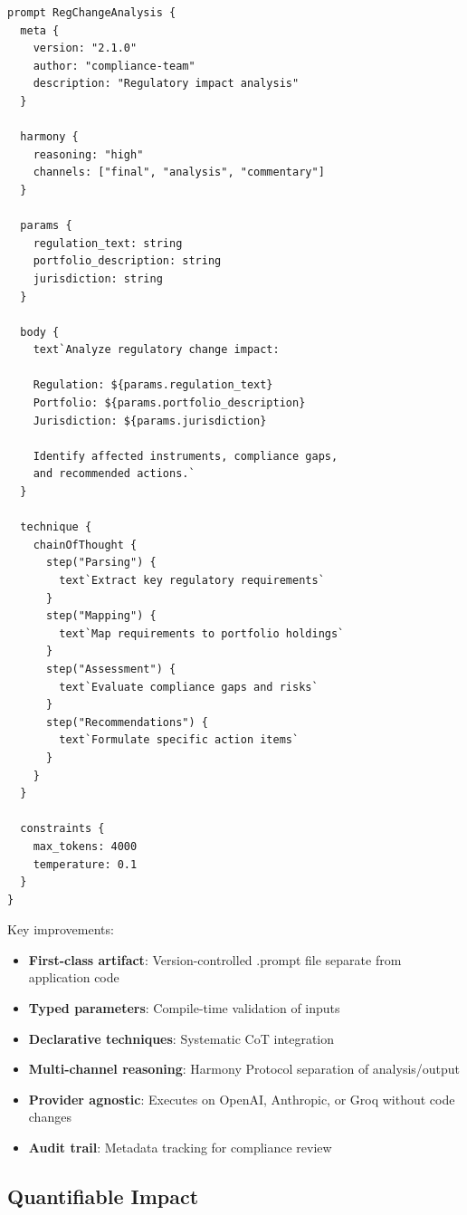 \documentclass[11pt,a4paper]{article}
\begin{document}
\begin{lstlisting}[caption=Promptel declarative specification]
prompt RegChangeAnalysis {
  meta {
    version: "2.1.0"
    author: "compliance-team"
    description: "Regulatory impact analysis"
  }

  harmony {
    reasoning: "high"
    channels: ["final", "analysis", "commentary"]
  }

  params {
    regulation_text: string
    portfolio_description: string
    jurisdiction: string
  }

  body {
    text`Analyze regulatory change impact:

    Regulation: ${params.regulation_text}
    Portfolio: ${params.portfolio_description}
    Jurisdiction: ${params.jurisdiction}

    Identify affected instruments, compliance gaps,
    and recommended actions.`
  }

  technique {
    chainOfThought {
      step("Parsing") {
        text`Extract key regulatory requirements`
      }
      step("Mapping") {
        text`Map requirements to portfolio holdings`
      }
      step("Assessment") {
        text`Evaluate compliance gaps and risks`
      }
      step("Recommendations") {
        text`Formulate specific action items`
      }
    }
  }

  constraints {
    max_tokens: 4000
    temperature: 0.1
  }
}
\end{lstlisting}

Key improvements:

\begin{itemize}
\item \textbf{First-class artifact}: Version-controlled .prompt file separate from application code
\item \textbf{Typed parameters}: Compile-time validation of inputs
\item \textbf{Declarative techniques}: Systematic CoT integration
\item \textbf{Multi-channel reasoning}: Harmony Protocol separation of analysis/output
\item \textbf{Provider agnostic}: Executes on OpenAI, Anthropic, or Groq without code changes
\item \textbf{Audit trail}: Metadata tracking for compliance review
\end{itemize}

\subsection{Quantifiable Impact}
\end{document}
